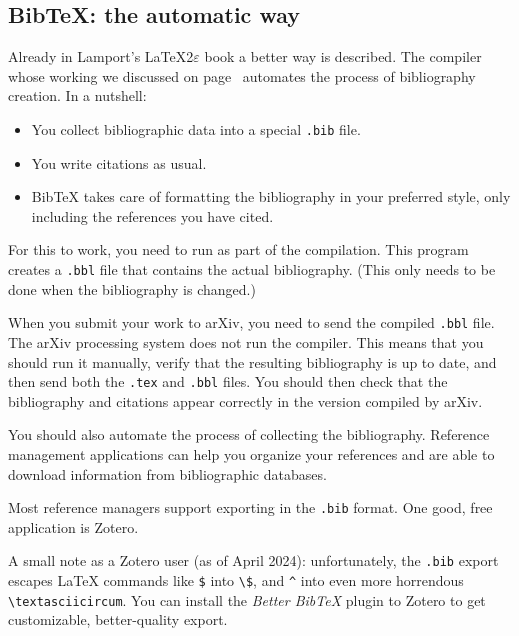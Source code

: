%
\subsection{BibTeX: the automatic way}

Already in Lamport's \LaTeX2$\varepsilon$ book \cite{lamport} a better way is described.
The  compiler whose working we discussed on page~\pageref{bibtex process}
automates the process of bibliography creation.
In a nutshell:
\begin{itemize}
\item You collect bibliographic data into a special \verb|.bib| file.
\item You write citations as usual.
\item BibTeX takes care of formatting the bibliography in your preferred style,
    only including the references you have cited.
\end{itemize}
%
For this to work, you need to run  as part of the compilation.
This program creates a \verb|.bbl| file that contains the actual bibliography.
(This only needs to be done when the bibliography is changed.)

\begin{remark}
When you submit your work to arXiv, you need to send the compiled \verb|.bbl| file.
The arXiv processing system does not run the  compiler.
This means that you should run it manually,
verify that the resulting bibliography is up to date,
and then send both the \verb|.tex| and \verb|.bbl| files.
You should then check that the bibliography and citations
appear correctly in the version compiled by arXiv.
\end{remark}

\begin{practices}
You should also automate the process of collecting the bibliography.
Reference management applications can help you organize your references
and are able to download information from bibliographic databases.

Most reference managers support exporting in the \verb|.bib| format.
One good, free application is Zotero\footnotemark.

A small note as a Zotero user (as of April 2024):
unfortunately, the \verb|.bib| export escapes \LaTeX{} commands like \verb|$| into \verb|\$|,
and \verb|^| into even more horrendous \verb|\textasciicircum|.
You can install the \emph{Better BibTeX} plugin to Zotero to get
customizable, better-quality export.\footnotemark
\end{practices}

